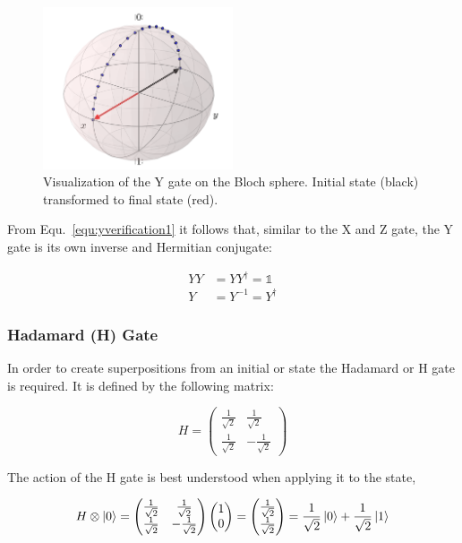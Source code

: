 \begin{figure}[ht]
   \centering
   \includegraphics[width=0.5\textwidth]{img/blochygate.png}
   \caption{Visualization of the Y gate on the Bloch sphere. Initial state (black) transformed to final state (red).}
   \label{img:blochygate}
\end{figure}

From Equ.~\ref{equ:yverification1} it follows that, similar to the X and Z gate, the Y gate is its own inverse and Hermitian conjugate:

\begin{align}
YY &= YY^\dagger = \mathbb{1} \\
Y &= Y^{-1} = Y^\dagger
\end{align}


\subsubsection{Hadamard (H) Gate}
\label{subsubsubsec:hadamardgate}

In order to create superpositions from an initial \0 or \1 state the Hadamard or H gate is required. It is defined by the following matrix:

\begin{equation}
H = \begin{pmatrix}
 \frac{1}{\sqrt{2}} & \frac{1}{\sqrt{2}} \\ 
 \frac{1}{\sqrt{2}} & -\frac{1}{\sqrt{2}}
 \end{pmatrix}
\end{equation}

The action of the H gate is best understood when applying it to the \0 state,

\begin{equation}
\label{equ:hadamardverification1}
H \otimes \ket{0} = \begin{pmatrix}
 \frac{1}{\sqrt{2}} & \frac{1}{\sqrt{2}} \\ 
 \frac{1}{\sqrt{2}} & -\frac{1}{\sqrt{2}}
 \end{pmatrix} \begin{pmatrix}
 1 \\ 
 0
 \end{pmatrix} = \begin{pmatrix}
 \frac{1}{\sqrt{2}} \\ 
 \frac{1}{\sqrt{2}}
 \end{pmatrix} = \frac{1}{\sqrt{2}} \ket{0} + \frac{1}{\sqrt{2}} \ket{1}
\end{equation}

